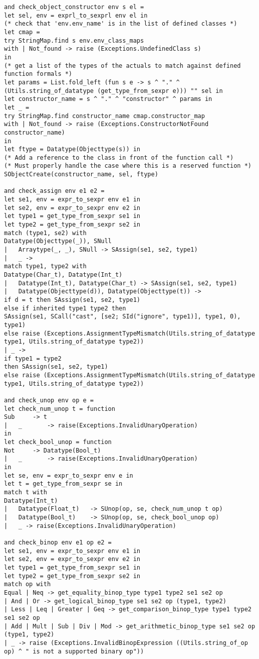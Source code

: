 \begin{verbatim}
and check_object_constructor env s el = 
let sel, env = exprl_to_sexprl env el in
(* check that 'env.env_name' is in the list of defined classes *)
let cmap = 
try StringMap.find s env.env_class_maps
with | Not_found -> raise (Exceptions.UndefinedClass s)
in
(* get a list of the types of the actuals to match against defined function formals *)
let params = List.fold_left (fun s e -> s ^ "." ^ (Utils.string_of_datatype (get_type_from_sexpr e))) "" sel in
let constructor_name = s ^ "." ^ "constructor" ^ params in
let _ = 
try StringMap.find constructor_name cmap.constructor_map
with | Not_found -> raise (Exceptions.ConstructorNotFound constructor_name)
in
let ftype = Datatype(Objecttype(s)) in
(* Add a reference to the class in front of the function call *)
(* Must properly handle the case where this is a reserved function *)
SObjectCreate(constructor_name, sel, ftype)

and check_assign env e1 e2 = 
let se1, env = expr_to_sexpr env e1 in
let se2, env = expr_to_sexpr env e2 in
let type1 = get_type_from_sexpr se1 in
let type2 = get_type_from_sexpr se2 in 
match (type1, se2) with
Datatype(Objecttype(_)), SNull 
| 	Arraytype(_, _), SNull -> SAssign(se1, se2, type1)
|   _ -> 
match type1, type2 with
Datatype(Char_t), Datatype(Int_t)
| 	Datatype(Int_t), Datatype(Char_t) -> SAssign(se1, se2, type1)
| 	Datatype(Objecttype(d)), Datatype(Objecttype(t)) ->
if d = t then SAssign(se1, se2, type1)
else if inherited type1 type2 then
SAssign(se1, SCall("cast", [se2; SId("ignore", type1)], type1, 0), type1)  
else raise (Exceptions.AssignmentTypeMismatch(Utils.string_of_datatype type1, Utils.string_of_datatype type2))
| _ -> 
if type1 = type2 
then SAssign(se1, se2, type1)
else raise (Exceptions.AssignmentTypeMismatch(Utils.string_of_datatype type1, Utils.string_of_datatype type2))

and check_unop env op e = 
let check_num_unop t = function
Sub 	-> t
| 	_ 		-> raise(Exceptions.InvalidUnaryOperation)
in 
let check_bool_unop = function
Not 	-> Datatype(Bool_t)
| 	_ 		-> raise(Exceptions.InvalidUnaryOperation)
in
let se, env = expr_to_sexpr env e in
let t = get_type_from_sexpr se in
match t with 
Datatype(Int_t) 	
|	Datatype(Float_t) 	-> SUnop(op, se, check_num_unop t op)
|  	Datatype(Bool_t) 	-> SUnop(op, se, check_bool_unop op)
| 	_ -> raise(Exceptions.InvalidUnaryOperation)

and check_binop env e1 op e2 =
let se1, env = expr_to_sexpr env e1 in
let se2, env = expr_to_sexpr env e2 in
let type1 = get_type_from_sexpr se1 in
let type2 = get_type_from_sexpr se2 in
match op with
Equal | Neq -> get_equality_binop_type type1 type2 se1 se2 op
| And | Or -> get_logical_binop_type se1 se2 op (type1, type2)
| Less | Leq | Greater | Geq -> get_comparison_binop_type type1 type2 se1 se2 op
| Add | Mult | Sub | Div | Mod -> get_arithmetic_binop_type se1 se2 op (type1, type2) 
| _ -> raise (Exceptions.InvalidBinopExpression ((Utils.string_of_op op) ^ " is not a supported binary op"))


\end{verbatim}
